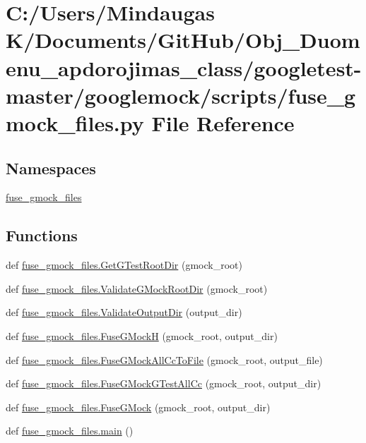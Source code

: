 \hypertarget{googletest-master_2googlemock_2scripts_2fuse__gmock__files_8py}{}\section{C\+:/\+Users/\+Mindaugas K/\+Documents/\+Git\+Hub/\+Obj\+\_\+\+Duomenu\+\_\+apdorojimas\+\_\+class/googletest-\/master/googlemock/scripts/fuse\+\_\+gmock\+\_\+files.py File Reference}
\label{googletest-master_2googlemock_2scripts_2fuse__gmock__files_8py}
\subsection*{Namespaces}
\begin{DoxyCompactItemize}
\item 
 \mbox{\hyperlink{namespacefuse__gmock__files}{fuse\+\_\+gmock\+\_\+files}}
\end{DoxyCompactItemize}
\subsection*{Functions}
\begin{DoxyCompactItemize}
\item 
def \mbox{\hyperlink{namespacefuse__gmock__files_aae591d77d2d969394996f9fc2017824c}{fuse\+\_\+gmock\+\_\+files.\+Get\+G\+Test\+Root\+Dir}} (gmock\+\_\+root)
\item 
def \mbox{\hyperlink{namespacefuse__gmock__files_aaec09f55a62b3d65b5d25fe0050e9e05}{fuse\+\_\+gmock\+\_\+files.\+Validate\+G\+Mock\+Root\+Dir}} (gmock\+\_\+root)
\item 
def \mbox{\hyperlink{namespacefuse__gmock__files_a68581e210793099d656537faa719df29}{fuse\+\_\+gmock\+\_\+files.\+Validate\+Output\+Dir}} (output\+\_\+dir)
\item 
def \mbox{\hyperlink{namespacefuse__gmock__files_abab451606f671f59404f23276aad2c34}{fuse\+\_\+gmock\+\_\+files.\+Fuse\+G\+MockH}} (gmock\+\_\+root, output\+\_\+dir)
\item 
def \mbox{\hyperlink{namespacefuse__gmock__files_af470a39a4df492b1ca0d9493eac8222b}{fuse\+\_\+gmock\+\_\+files.\+Fuse\+G\+Mock\+All\+Cc\+To\+File}} (gmock\+\_\+root, output\+\_\+file)
\item 
def \mbox{\hyperlink{namespacefuse__gmock__files_a50eb499fcb075e19191e8403bd85c813}{fuse\+\_\+gmock\+\_\+files.\+Fuse\+G\+Mock\+G\+Test\+All\+Cc}} (gmock\+\_\+root, output\+\_\+dir)
\item 
def \mbox{\hyperlink{namespacefuse__gmock__files_ae76b6bc18373325fc3f002abf5c4378f}{fuse\+\_\+gmock\+\_\+files.\+Fuse\+G\+Mock}} (gmock\+\_\+root, output\+\_\+dir)
\item 
def \mbox{\hyperlink{namespacefuse__gmock__files_a64e8cd1ead5a1454265cbc2d3db4d425}{fuse\+\_\+gmock\+\_\+files.\+main}} ()
\end{DoxyCompactItemize}
